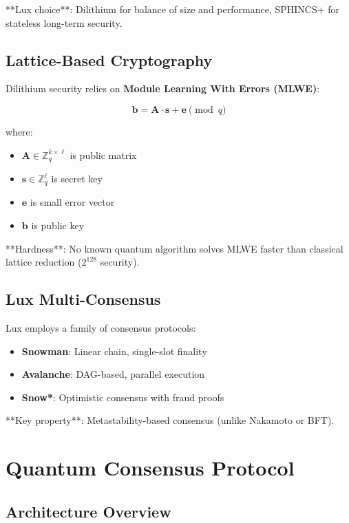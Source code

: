 \documentclass[11pt,letterpaper]{article}
\begin{document}
**Lux choice**: Dilithium for balance of size and performance, SPHINCS+ for stateless long-term security.

\subsection{Lattice-Based Cryptography}

Dilithium security relies on \textbf{Module Learning With Errors (MLWE)}:

\begin{equation}
\mathbf{b} = \mathbf{A} \cdot \mathbf{s} + \mathbf{e} \pmod{q}
\end{equation}

where:
\begin{itemize}
    \item $\mathbf{A} \in \mathbb{Z}_q^{k \times \ell}$ is public matrix
    \item $\mathbf{s} \in \mathbb{Z}_q^\ell$ is secret key
    \item $\mathbf{e}$ is small error vector
    \item $\mathbf{b}$ is public key
\end{itemize}

**Hardness**: No known quantum algorithm solves MLWE faster than classical lattice reduction ($2^{128}$ security).

\subsection{Lux Multi-Consensus}

Lux employs a family of consensus protocols:

\begin{itemize}
    \item \textbf{Snowman}: Linear chain, single-slot finality
    \item \textbf{Avalanche}: DAG-based, parallel execution
    \item \textbf{Snow*}: Optimistic consensus with fraud proofs
\end{itemize}

**Key property**: Metastability-based consensus (unlike Nakamoto or BFT).

\section{Quantum Consensus Protocol}

\subsection{Architecture Overview}
\end{document}
